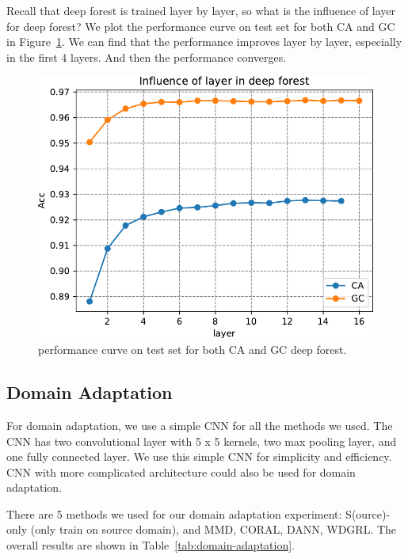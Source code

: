 \documentclass{article} %
\begin{document}
Recall that deep forest is trained layer by layer, so what is the influence of layer for deep forest? We plot the performance curve on test set for both CA and GC in Figure~\ref{fig:DF-ca-gc}. We can find that the performance improves layer by layer, especially in the first 4 layers. And then the performance converges.
\begin{figure}[h]
\centering
\includegraphics[width=0.7\linewidth]{figs/DF-ca-gc}
\caption{performance curve on test set for both CA and GC deep forest.}
\label{fig:DF-ca-gc}
\end{figure}



\subsection{Domain Adaptation}
For domain adaptation, we use a simple CNN for all the methods we used. The CNN has two convolutional layer with 5 x 5 kernels, two max pooling layer, and one fully connected layer. We use this simple CNN for simplicity and efficiency. CNN with more complicated architecture could also be used for domain adaptation. 
 
There are 5 methods we used for our domain adaptation experiment: S(ource)-only (only train on source domain), and MMD, CORAL, DANN, WDGRL. The overall results are shown in Table~\ref{tab:domain-adaptation}.
\end{document}
